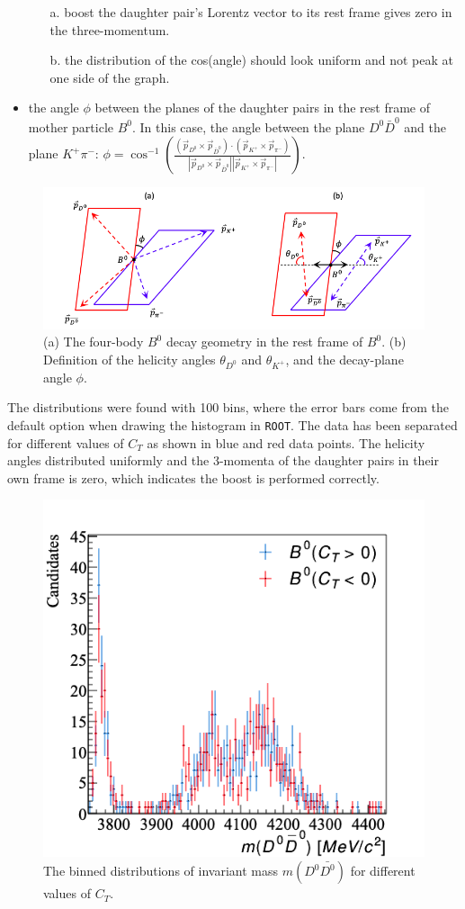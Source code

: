 \begin{itemize}
\begin{itemize}
        a. boost the daughter pair's Lorentz vector to its rest frame gives zero in the three-momentum.
        
        b. the distribution of the cos(angle) should look uniform and not peak at one side of the graph.
    \end{itemize}
    \item the angle $\phi$ between the planes of the daughter pairs in the rest frame of mother particle $B^0$. In this case, the angle between the plane $D^0\bar{D}^0$ and the plane $K^+\pi^-$: $\phi = \cos^{-1}\left(\frac{(\Vec{p}_{D^0}\times\Vec{p}_{\bar{D}^0})\cdot(\Vec{p}_{K^+}\times\Vec{p}_{\pi^-})}{|\Vec{p}_{D^0}\times\Vec{p}_{\bar{D}^0}||\Vec{p}_{K^+}\times\Vec{p}_{\pi^-}|}\right)$.
\end{itemize}
\begin{figure}[h]
\center
\includegraphics*[width=0.76\linewidth]{decay_geometry}
\caption{(a) The four-body $B^0$ decay geometry in the rest frame of $B^0$. (b) Definition of the helicity angles $\theta_{D^0}$ and $\theta_{K^+}$, and the decay-plane angle $\phi$.}
\label{decay_geometry}
\end{figure}
\clearpage
The distributions were found with 100 bins, where the error bars come from the default option when drawing the histogram in \texttt{ROOT}. The data has been separated for different values of $C_T$ as shown in blue and red data points. The helicity angles distributed uniformly and the 3-momenta of the daughter pairs in their own frame is zero, which indicates the boost is performed correctly. 
\begin{figure}[h]
\center
\includegraphics*[width=0.46\linewidth]{CM_variables_B0/invmass_D0Dbar0}
\caption{The binned distributions of invariant mass $m(D^0\bar{D^0})$ for different values of $C_T$.}
\label{invdd}
\end{figure}

